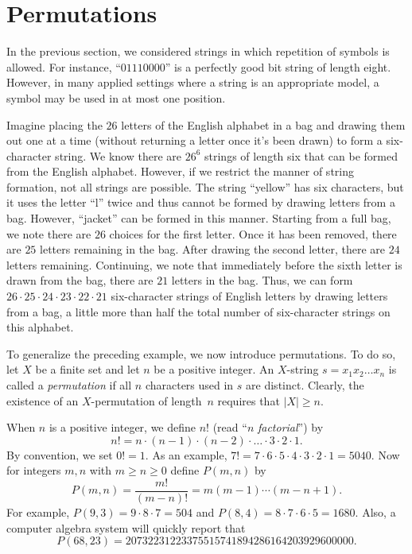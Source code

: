 \section{Permutations}\label{s:strings:permutations}

In the previous section, we considered strings in which repetition of
symbols is allowed. For instance, ``$01110000$'' is a perfectly good
bit string of length eight. However, in many applied settings where a
string is an appropriate model, a symbol may be used in at most one
position.

\begin{example}\label{exa:strings:perm}
  Imagine placing the $26$ letters of the English alphabet in a bag
  and drawing them out one at a time (without returning a letter once
  it's been drawn) to form a six-character string. We know there are
  $26^6$ strings of length six that can be formed from the English
  alphabet. However, if we restrict the manner of string formation,
  not all strings are possible. The string ``yellow'' has six
  characters, but it uses the letter ``l'' twice and thus cannot be
  formed by drawing letters from a bag. However, ``jacket'' can be
  formed in this manner. Starting from a full bag, we note there are
  $26$ choices for the first letter. Once it has been removed, there
  are $25$ letters remaining in the bag. After drawing the second
  letter, there are $24$ letters remaining. Continuing, we note that
  immediately before the sixth letter is drawn from the bag, there are
  $21$ letters in the bag. Thus, we can form $26\cdot 25\cdot 24\cdot
  23\cdot 22\cdot 21$ six-character strings of English letters by
  drawing letters from a bag, a little more than half the total number
  of six-character strings on this alphabet.
\end{example}

To generalize the preceding example, we now introduce permutations. To
do so, let $X$ be a finite set and let $n$ be a positive integer.  An
$X$-string $s=x_1x_2\dots x_n$ is called a \textit{permutation} if all
$n$ characters used in $s$ are distinct.  Clearly, the existence of an
$X$-permutation of length~$n$ requires that $|X|\ge n$.

When $n$ is a positive integer, we define $n!$ (read ``$n$
\textit{factorial}'') by
\[
n! = n\cdot (n-1)\cdot (n-2)\cdot \ldots\cdot 3\cdot 2\cdot 1. 
\]
By convention, we set $0!=1$. As an example, $7!=7\cdot 6\cdot 5\cdot
4\cdot 3\cdot 2 \cdot 1=5040$.  Now for integers $m,n$ with $m\ge
n\ge0$ define $P(m,n)$ by
\[
P(m,n) = \frac{m!}{(m-n)!} = m(m-1)\cdots(m-n+1).
\]
For example, $P(9,3)=9\cdot 8\cdot 7=504$ and $P(8,4)=8\cdot 7\cdot
6\cdot5 =1680$.  Also, a computer algebra system will quickly report
that
\[
P(68,23) = 20732231223375515741894286164203929600000.
\]

